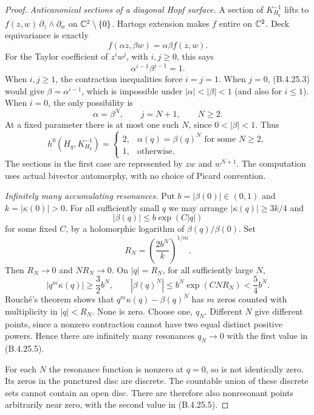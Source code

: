 \begin{proof}
\emph{Anticanonical sections of a diagonal Hopf surface.}
A section of $K_{H_q}^{-1}$ lifts to
$f(z,w)\,\partial_z\wedge\partial_w$ on
$\mathbb C^2\setminus\{0\}$. Hartogs extension makes $f$
entire on $\mathbb C^2$. Deck equivariance is exactly
\[
 f(\alpha z,\beta w)=\alpha\beta f(z,w).
                                                        \tag{B.4.25.2}
\]
For the Taylor coefficient of $z^i w^j$, with $i,j\ge0$,
this says
\[
 \alpha^{i-1}\beta^{j-1}=1.                             \tag{B.4.25.3}
\]
When $i,j\ge1$, the contraction inequalities force
$i=j=1$. When $j=0$, (B.4.25.3) would give
$\beta=\alpha^{i-1}$, which is impossible under
$|\alpha|<|\beta|<1$ (and also for $i\le1$).
When $i=0$, the only possibility is
\[
 \alpha=\beta^N,\qquad j=N+1,\qquad N\ge2.
                                                        \tag{B.4.25.4}
\]
At a fixed parameter there is at most one such $N$,
since $0<|\beta|<1$. Thus
\[
 h^0(H_q,K_{H_q}^{-1})=
 \begin{cases}
 2,&\alpha(q)=\beta(q)^N\text{ for some }N\ge2,\\
 1,&\text{otherwise}.
 \end{cases}                                           \tag{B.4.25.5}
\]
The sections in the first case are represented by
$zw$ and $w^{N+1}$. The computation uses actual
bivector automorphy, with no choice of Picard convention.

\emph{Infinitely many accumulating resonances.}
Put $b=|\beta(0)|\in(0,1)$ and $k=|\kappa(0)|>0$.
For all sufficiently small $q$ we may arrange
$|\kappa(q)|\ge3k/4$ and
\[
 |\beta(q)|\le b\exp(C|q|)
\]
for some fixed $C$, by a holomorphic logarithm of
$\beta(q)/\beta(0)$. Set
\[
 R_N=\left(\frac{2b^N}{k}\right)^{1/m}.
\]
Then $R_N\to0$ and $N R_N\to0$. On $|q|=R_N$, for
all sufficiently large $N$,
\[
 |q^m\kappa(q)|\ge\frac32 b^N,
 \qquad |\beta(q)^N|\le b^N\exp(CN R_N)<\frac54 b^N.
\]
Rouch\'e's theorem shows that
$q^m\kappa(q)-\beta(q)^N$ has $m$ zeros counted with
multiplicity in $|q|<R_N$. None is zero. Choose one,
$q_N$. Different $N$ give different points, since a
nonzero contraction cannot have two equal distinct
positive powers. Hence there are infinitely many
resonances $q_N\to0$ with the first value in
(B.4.25.5).

For each $N$ the resonance function is nonzero at
$q=0$, so is not identically zero. Its zeros in the
punctured disc are discrete. The countable union of
these discrete sets cannot contain an open disc.
There are therefore also nonresonant points arbitrarily
near zero, with the second value in (B.4.25.5).


\end{proof}
